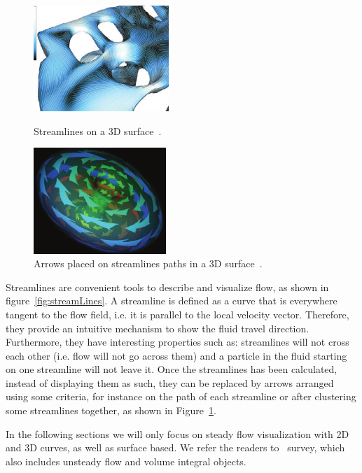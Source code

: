 \begin{figure}[htbp]
	\centering
	\begin{minipage}[t]{.45\textwidth}
		\centering
		\includegraphics[width=.8\textwidth,height=4cm]{images/streamLinesSpencer}
		\caption{Streamlines on a 3D surface~\cite{Spencer2009}.}
		\label{fig:streamLines}
	\end{minipage}\hfill
	\begin{minipage}[t]{.45\textwidth}
		\centering
		\includegraphics[width=.8\textwidth,height=4cm]{images/streamArrows}
		\caption{Arrows placed on streamlines paths in a 3D surface~\cite{loffelmann1998}.}
		\label{fig:streamArrows}
	\end{minipage}
\end{figure}

Streamlines are convenient tools to describe and visualize flow, as shown in figure~\ref{fig:streamLines}.
A streamline is defined as a curve that is everywhere tangent to the flow field, i.e. it is parallel to the local velocity vector.
Therefore, they provide an intuitive mechanism to show the fluid travel direction.
Furthermore, they have interesting properties such as: streamlines will not cross each other (i.e. flow will not go across them) and a particle in the fluid starting on one streamline will not leave it.
Once the streamlines has been calculated, instead of displaying them as such, they can be replaced by arrows arranged using some criteria, for instance on the path of each streamline or after clustering some streamlines together, as shown in Figure~\ref{fig:streamArrows}.

In the following sections we will only focus on steady flow visualization with 2D and 3D curves, as well as surface based.
We refer the readers to~\cite{McLoughlin2010} survey, which also includes unsteady flow and volume integral objects.

